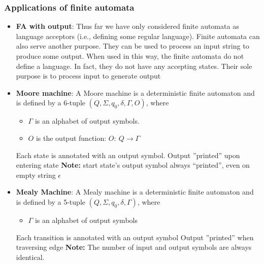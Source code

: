 \documentclass{report}
\begin{document}
    \pagebreak 
    \subsubsection{Applications of finite automata}
    \begin{itemize}
        \item \textbf{FA with output}:
            Thus far we have only considered finite automata as language acceptors (i.e., defining some regular language).
            \bigbreak \noindent 
            Finite automata can also serve another purpose. They can be used to process an input string to produce some output.
            \bigbreak \noindent 
            When used in this way, the finite automata do not define a language. In fact, they do not have any accepting states.
            \bigbreak \noindent 
            Their sole purpose is to process input to generate output
        \item \textbf{Moore machine}: A Moore machine is a deterministic finite automaton and is
            defined by a 6-tuple $(Q, \Sigma, q_{0}, \delta, \Gamma, O)$, where
            \begin{itemize}
                \item $\Gamma$ is an alphabet of output symbols.
                \item $O$ is the output function: $O:\ Q \to \Gamma$
            \end{itemize}
            \bigbreak \noindent 
            Each state is annotated with an output symbol. Output ”printed” upon entering state
            \bigbreak \noindent 
            \textbf{Note:} start state’s output symbol always “printed”, even on empty string $\epsilon$
        \item \textbf{Mealy Machine}: A Mealy machine is a deterministic finite automaton and is defined by a 5-tuple $(Q, \Sigma, q_{0}, \delta, \Gamma)$, where 
            \begin{itemize}
                \item $\Gamma$ is an alphabet of output symbols
            \end{itemize}
            \bigbreak \noindent 
            Each transition is annotated with an output symbol Output ”printed” when traversing edge
            \bigbreak \noindent 
            \textbf{Note:} The number of input and output symbols are always identical.
            \bigbreak \noindent 

    \end{itemize}
\end{document}
